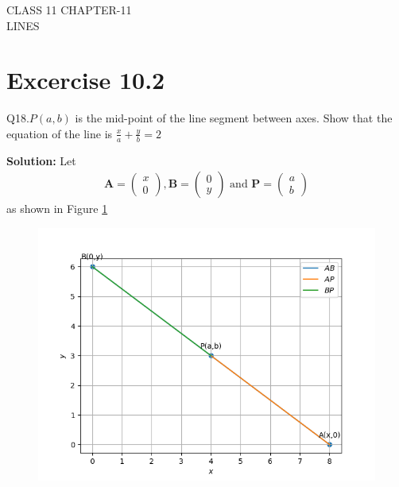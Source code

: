 \documentclass[12pt]{article}
\newcommand{\solution}{\noindent \textbf{Solution: }}
\newcommand{\myvec}[1]{\ensuremath{\begin{pmatrix}#1\end{pmatrix}}}
\let\vec\mathbf
\begin{document}
\begin{center}
\textbf\large{CLASS 11 CHAPTER-11 \\ LINES}

\end{center}
\section*{Excercise 10.2}

Q18.$P(a,b)$ is the mid-point of the line segment between axes. Show that the equation of the line is $\frac{x}{a}+\frac{y}{b}=2$

\solution
Let
\begin{align}
	\vec{A}=\myvec{x\\0}, \vec{B}=\myvec{0\\y} \text{ and } \vec{P}=\myvec{a\\b}
\end{align}
as shown in Figure \ref{fig:Fig1}
\begin{figure}[!h]
	\begin{center} 
	    \includegraphics[width=\columnwidth]{figs/line1}
	\end{center}
\caption{}
\label{fig:Fig1}
\end{figure}
\end{document}

